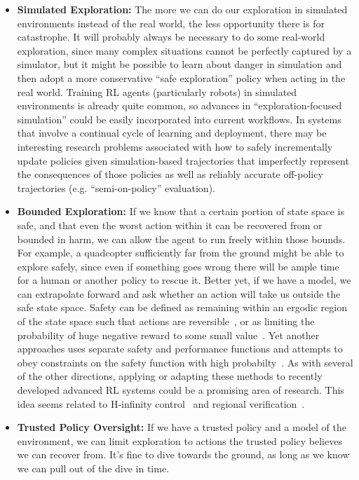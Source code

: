 \documentclass[a4paper,10pt]{article}
\begin{document}
\begin{itemize}
\item {\bf Simulated Exploration:}  The more we can do our exploration in simulated environments instead of the real world, the less opportunity there is for catastrophe. It will probably always be necessary to do some real-world exploration, since many complex situations cannot be perfectly captured by a simulator, but it might be possible to learn about danger in simulation and then adopt a more conservative ``safe exploration'' policy when acting in the real world.  Training RL agents (particularly robots) in simulated environments is already quite common, so advances in ``exploration-focused simulation'' could be easily incorporated into current workflows. In systems that involve a continual cycle of learning and deployment, there may be interesting research problems associated with how to safely incrementally update policies given simulation-based trajectories that imperfectly represent the consequences of those policies as well as reliably accurate off-policy trajectories (e.g. “semi-on-policy” evaluation).

\item {\bf Bounded Exploration:}  If we know that a certain portion of state space is safe, and that even the worst action within it can be recovered from or bounded in harm, we can allow the agent to run freely within those bounds. For example, a quadcopter sufficiently far from the ground might be able to explore safely, since even if something goes wrong there will be ample time for a human or another policy to rescue it. Better yet, if we have a model, we can extrapolate forward and ask whether an action will take us outside the safe state space. Safety can be defined as remaining within an ergodic region of the state space such that actions are reversible~\cite{moldovan2012safe, turchetta2016safe}, or as limiting the probability of huge negative reward to some small value~\cite{thomas2015high}.  Yet another approaches uses separate safety and performance functions and attempts to obey constraints on the safety function with high probabilty~\cite{berkenkamp1602bayesian}.  As with several of the other directions, applying or adapting these methods to recently developed advanced RL systems could be a promising area of research. This idea seems related to H-infinity control~\cite{bacsar2008h} and regional verification~\cite{steinhardt2012finite}.

\item {\bf Trusted Policy Oversight:}  If we have a trusted policy and a model of the environment, we can limit exploration to actions the trusted policy believes we can recover from. It’s fine to dive towards the ground, as long as we know we can pull out of the dive in time. 


\end{itemize}
\end{document}
